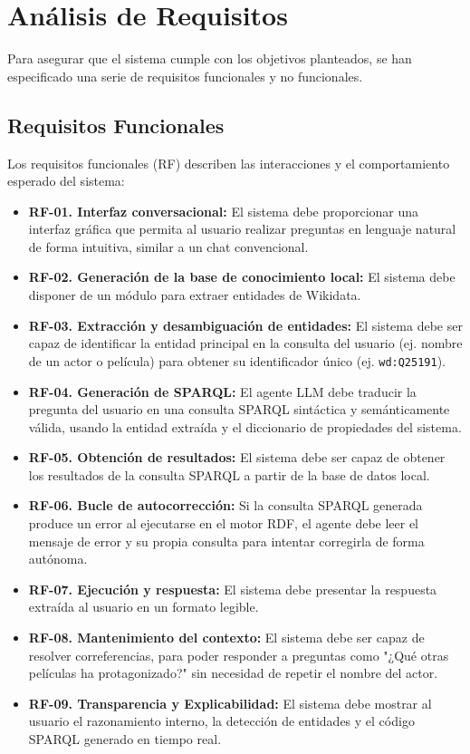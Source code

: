 \section{Análisis de Requisitos}

Para asegurar que el sistema cumple con los objetivos planteados, se han especificado una serie de requisitos funcionales y no funcionales.

\subsection{Requisitos Funcionales}

Los requisitos funcionales (RF) describen las interacciones y el comportamiento esperado del sistema:

\begin{itemize}
    \item \textbf{RF-01. Interfaz conversacional:} El sistema debe proporcionar una interfaz gráfica que permita al usuario realizar preguntas en lenguaje natural de forma intuitiva, similar a un chat convencional.
    \item \textbf{RF-02. Generación de la base de conocimiento local:} El sistema debe disponer de un módulo para extraer entidades de Wikidata.
    \item \textbf{RF-03. Extracción y desambiguación de entidades:} El sistema debe ser capaz de identificar la entidad principal en la consulta del usuario (ej. nombre de un actor o película) para obtener su identificador único (ej. \texttt{wd:Q25191}).
    \item \textbf{RF-04. Generación de SPARQL:} El agente LLM debe traducir la pregunta del usuario en una consulta SPARQL sintáctica y semánticamente válida, usando la entidad extraída y el diccionario de propiedades del sistema.
    \item \textbf{RF-05. Obtención de resultados:} El sistema debe ser capaz de obtener los resultados de la consulta SPARQL a partir de la base de datos local.
    \item \textbf{RF-06. Bucle de autocorrección:} Si la consulta SPARQL generada produce un error al ejecutarse en el motor RDF, el agente debe leer el mensaje de error y su propia consulta para intentar corregirla de forma autónoma.
    \item \textbf{RF-07. Ejecución y respuesta:} El sistema debe presentar la respuesta extraída al usuario en un formato legible.
    \item \textbf{RF-08. Mantenimiento del contexto:} El sistema debe ser capaz de resolver correferencias, para poder responder a preguntas como "¿Qué otras películas ha protagonizado?" sin necesidad de repetir el nombre del actor.
    \item \textbf{RF-09. Transparencia y Explicabilidad:} El sistema debe mostrar al usuario el razonamiento interno, la detección de entidades y el código SPARQL generado en tiempo real.
\end{itemize}

